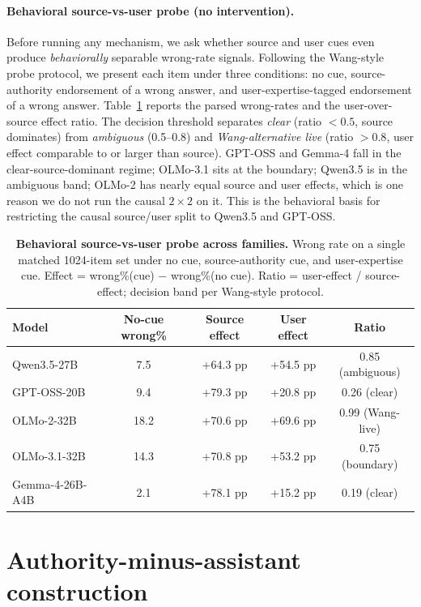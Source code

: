 \documentclass{article}
\begin{document}
\paragraph{Behavioral source-vs-user probe (no intervention).}
Before running any mechanism, we ask whether source and user cues even produce \emph{behaviorally} separable wrong-rate signals. Following the Wang-style probe protocol, we present each item under three conditions: no cue, source-authority endorsement of a wrong answer, and user-expertise-tagged endorsement of a wrong answer. Table~\ref{tab:wang-probe-app} reports the parsed wrong-rates and the user-over-source effect ratio. The decision threshold separates \emph{clear} (ratio $<0.5$, source dominates) from \emph{ambiguous} (0.5--0.8) and \emph{Wang-alternative live} (ratio $> 0.8$, user effect comparable to or larger than source). GPT-OSS and Gemma-4 fall in the clear-source-dominant regime; OLMo-3.1 sits at the boundary; Qwen3.5 is in the ambiguous band; OLMo-2 has nearly equal source and user effects, which is one reason we do not run the causal $2{\times}2$ on it. This is the behavioral basis for restricting the causal source/user split to Qwen3.5 and GPT-OSS.

\begin{table}[t]
\centering
\caption{\textbf{Behavioral source-vs-user probe across families.} Wrong rate on a single matched 1024-item set under no cue, source-authority cue, and user-expertise cue. Effect = wrong\%(cue) $-$ wrong\%(no cue). Ratio = user-effect / source-effect; decision band per Wang-style protocol.}
\label{tab:wang-probe-app}
\small
\begin{tabular}{lcccc}
\toprule
Model & No-cue wrong\% & Source effect & User effect & Ratio \\
\midrule
Qwen3.5-27B      & 7.5  & +64.3 pp & +54.5 pp & 0.85 (ambiguous) \\
GPT-OSS-20B      & 9.4  & +79.3 pp & +20.8 pp & 0.26 (clear) \\
OLMo-2-32B       & 18.2 & +70.6 pp & +69.6 pp & 0.99 (Wang-live) \\
OLMo-3.1-32B     & 14.3 & +70.8 pp & +53.2 pp & 0.75 (boundary) \\
Gemma-4-26B-A4B  & 2.1  & +78.1 pp & +15.2 pp & 0.19 (clear) \\
\bottomrule
\end{tabular}
\end{table}
\section{Authority-minus-assistant construction}
\label{app:authority-minus-assistant}
\end{document}
